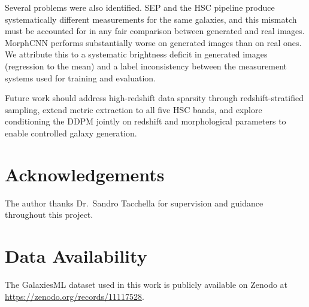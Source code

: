 \documentclass[fleqn,usenatbib]{mnras}
\begin{document}
Several problems were also identified.
SEP and the HSC pipeline produce systematically different measurements
for the same galaxies, and this mismatch must be accounted for in any
fair comparison between generated and real images.
MorphCNN performs substantially worse on generated images than on real
ones.
We attribute this to a systematic brightness deficit in generated
images (regression to the mean) and a label inconsistency between the
measurement systems used for training and evaluation.

Future work should address high-redshift data sparsity through
redshift-stratified sampling, extend metric extraction to all five HSC
bands, and explore conditioning the DDPM jointly on redshift and
morphological parameters to enable controlled galaxy generation.

\section*{Acknowledgements}

The author thanks Dr.\ Sandro Tacchella for supervision and guidance
throughout this project.

\section*{Data Availability}

 
The GalaxiesML dataset used in this work is publicly available on
Zenodo at \url{https://zenodo.org/records/11117528}.













\bsp	%
\label{lastpage}
\end{document}
